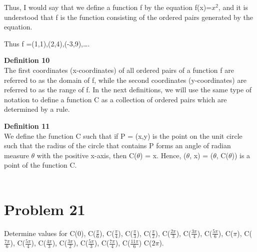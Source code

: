 \documentclass[11pt]{article} %
\newcommand\tab[1][1cm]{\hspace*{#1}}
\begin{document}
Thus, I would say that we define a function f by the equation f(x)=$x^2$, and it is understood that f is the function consisting of the ordered pairs generated by the equation. 

Thus f ={(1,1),(2,4),(-3,9),\dots}. 

\textbf{Definition 10}
\\ \tab The first coordinates (x-coordinates) of all ordered pairs of a function f are referred to as the domain of f, while the second coordinates (y-coordinates) are referred to as the range of f.
In the next definitions, we will use the same type of notation to define a function C as a collection of ordered pairs which are determined by a rule.

\textbf{Definition 11} \\
\tab We define the function C such that if P = (x,y) is the point on the unit circle such that the radius of the circle that contains P forms an angle of radian measure $\theta$ with the positive x-axis, then C($\theta$) = x. Hence, ($\theta$, x) = ($\theta$, C($\theta$)) is a point of the function C. 
\\
\\
\section{Problem 21}
\tab Determine values for C(0), C($\frac{\pi}{6}$), C($\frac{\pi}{4}$), C($\frac{\pi}{3}$), C($\frac{\pi}{2}$),
C($\frac{2\pi}{3}$), C($\frac{3\pi}{4}$), C($\frac{5\pi}{6}$), C($\pi$), C($\frac{7\pi}{6}$), C($\frac{5\pi}{4}$),
C($\frac{4\pi}{3}$), C($\frac{3\pi}{2}$), C($\frac{5\pi}{3}$), C($\frac{7\pi}{4}$), C($\frac{11\pi}{6}$) C($2\pi$).
\end{document}
